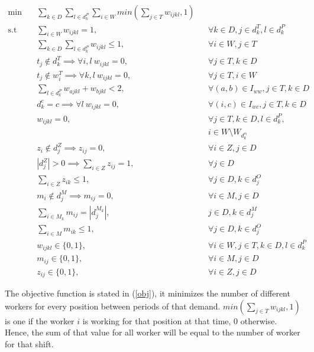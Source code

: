 \documentclass[../thesis.tex]{subfiles}
\begin{document}
    \begin{align}
        \textrm{min} \quad & \sum_{k \in D} \sum_{l \in d^P_k} \sum_{i \in W} min(\sum_{j \in T} w_{ijkl}, 1) & \label{obj} \\ 
        \textrm{s.t} \quad & \sum_{i \in W} w_{ijkl} = 1, && \forall k \in D, j \in d_k^T, l \in d_k^P \label{wc1} \\
        & \sum_{k \in D} \sum_{l \in d_k^P} w_{ijkl} \leq 1, && \forall i \in W, j \in T \label{wc2} \\
        & t_j \notin d^T_{k} \implies \forall i, l \ w_{ijkl} = 0,  & &\forall j \in T , k \in D \label{wc3} \\
        & t_j \notin w^T_{i} \implies \forall k, l \ w_{ijkl} = 0, && \forall j \in T, i \in W \label{wc4} \\ 
        & \sum_{l \in d^P_k} w_{ajkl} + w_{bjkl} < 2, &&  \forall {(a, b) \in I_{ww}}, j \in T, k \in D \label{wc5} \\
        & d^c_{k} = c \implies \forall l \ w_{ijkl} = 0, && \forall {(i, c) \in I_{wc}}, j \in T, k \in D \label{wc6} \\ 
        & w_{ijkl} = 0, && \forall j \in T, k \in D, l \in d^P_k, \label{wc7} \\
        & && i \in W \setminus W_{d^{s_l}_k} \nonumber\\
        & z_i \notin d^Z_j \implies z_{ij} = 0, && \forall i \in Z, j \in D \label{zc1}  \\
        & |d^Z_j| > 0 \implies \sum_{i \in Z} z_{ij} = 1, && \forall j \in D \label{zc2} \\
        & \sum_{i \in Z} z_{ik} \leq 1, && \forall j \in D, k \in d^O_j  \label{zc3} \\
        & m_i \notin d^M_j \implies m_{ij} = 0, && \forall i \in M, j \in D  \label{mc1} \\
        & \sum_{i \in M_k} m_{ij} = |d^{M_k}_j|, && j \in D, k \in d^M_j  \label{mc2} \\
        & \sum_{i \in M} m_{ik} \leq 1, && \forall j \in D, k \in d^O_j  \label{mc3} \\
        & w_{ijkl} \in \{0, 1\}, && \forall i \in W, j \in T, k \in D, l \in d^P_k \label{binary1} \\
        & m_{ij} \in \{0, 1\}, && \forall i \in M, j \in D \label{binary2} \\ 
        & z_{ij} \in \{0, 1\}, && \forall i \in Z, j \in D \label{binary3}
    \end{align}
    
The objective function is stated in (\ref{obj}), it minimizes the number of different workers for every position between periods of that demand. $min(\sum_{j \in T} w_{ijkl}, 1)$ is one if the worker $i$ is working for that position at that time, 0 otherwise. Hence, the sum of that value for all worker will be equal to the number of worker for that shift.
\end{document}
